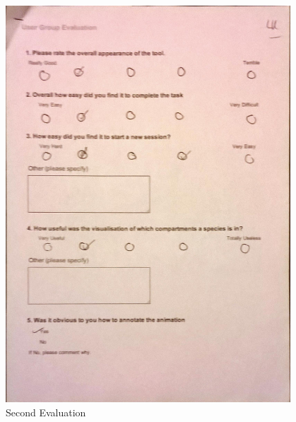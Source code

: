 \begin{figure}[h!]
    \centering
    \includegraphics[width=0.95\textwidth]{images/user_eval/user_eval_12.jpg}
    \caption{Second Evaluation}
\end{figure}

